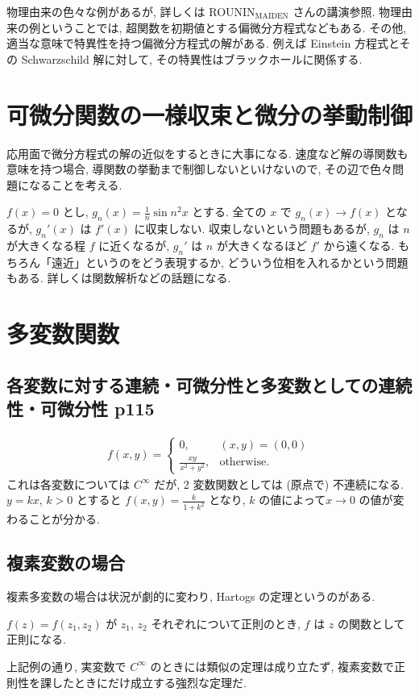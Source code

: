 \documentclass[openany, a4paper, oneside]{jsbook}
\begin{document}
物理由来の色々な例があるが, 詳しくは ROUNIN$_{\text{MAIDEN}}$ さんの講演参照.
物理由来の例ということでは, 超関数を初期値とする偏微分方程式などもある.
その他, 適当な意味で特異性を持つ偏微分方程式の解がある.
例えば Einstein 方程式とその Schwarzschild 解に対して, その特異性はブラックホールに関係する.
\section{可微分関数の一様収束と微分の挙動制御}

応用面で微分方程式の解の近似をするときに大事になる.
速度など解の導関数も意味を持つ場合, 導関数の挙動まで制御しないといけないので, その辺で色々問題になることを考える.

$f (x) = 0$ とし, $g_n (x) = \frac{1}{n} \sin n^2 x$ とする.
全ての $x$ で $g_n (x) \to f (x)$ となるが, $g_n'(x)$ は $f'(x)$ に収束しない.
収束しないという問題もあるが, $g_n$ は $n$ が大きくなる程 $f$ に近くなるが, $g_n'$ は $n$ が大きくなるほど $f'$ から遠くなる.
もちろん「遠近」というのをどう表現するか, どういう位相を入れるかという問題もある.
詳しくは関数解析などの話題になる.
\section{多変数関数}

\subsection{各変数に対する連続・可微分性と多変数としての連続性・可微分性 \cite{GelbaumOlmsted1} p115}

\begin{align}
 f (x, y)
 =
 \begin{cases}
  0,                  & (x, y) = (0, 0) \\
  \frac{xy}{x^2+y^2}, & \mathrm{otherwise}.
 \end{cases}
\end{align}
これは各変数については $C^{\infty}$ だが, 2 変数関数としては (原点で) 不連続になる.
$y = k x$, $k > 0$ とすると $f (x, y) = \frac{k}{1 + k^2}$ となり, $k$ の値によって$x \to 0$ の値が変わることが分かる.
\subsection{複素変数の場合}

複素多変数の場合は状況が劇的に変わり, Hartogs の定理というのがある.
\begin{thm}
 $f (z) = f (z_1, z_2)$ が $z_1$, $z_2$ それぞれについて正則のとき, $f$ は $z$ の関数として正則になる.
\end{thm}
上記例の通り, 実変数で $C^{\infty}$ のときには類似の定理は成り立たず, 複素変数で正則性を課したときにだけ成立する強烈な定理だ.
\end{document}
